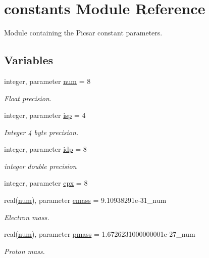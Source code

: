 \hypertarget{namespaceconstants}{}\section{constants Module Reference}
\label{namespaceconstants}


Module containing the Picsar constant parameters.  


\subsection*{Variables}
\begin{DoxyCompactItemize}
\item 
integer, parameter \hyperlink{namespaceconstants_afe19f7f8af171411c51fb763b36e3823}{num} = 8
\begin{DoxyCompactList}\small\item\em Float precision. \end{DoxyCompactList}\item 
integer, parameter \hyperlink{namespaceconstants_a5a2ae450a00d2a29f9b70dcb776f7a2f}{isp} = 4
\begin{DoxyCompactList}\small\item\em Integer 4 byte precision. \end{DoxyCompactList}\item 
integer, parameter \hyperlink{namespaceconstants_ae345db51770e3628e6aaf76e6a45e160}{idp} = 8
\begin{DoxyCompactList}\small\item\em integer double precision \end{DoxyCompactList}\item 
integer, parameter \hyperlink{namespaceconstants_a5709f0ae2ee52b1906446ad25ed0f587}{cpx} = 8
\item 
real(\hyperlink{namespaceconstants_afe19f7f8af171411c51fb763b36e3823}{num}), parameter \hyperlink{namespaceconstants_ad39536f583f0861abb2fb19a27c56fc8}{emass} = 9.\+10938291e-\/31\+\_\+num
\begin{DoxyCompactList}\small\item\em Electron mass. \end{DoxyCompactList}\item 
real(\hyperlink{namespaceconstants_afe19f7f8af171411c51fb763b36e3823}{num}), parameter \hyperlink{namespaceconstants_a44f3d8cbf9c39db63d7533d985cc51c3}{pmass} = 1.\+6726231000000001e-\/27\+\_\+num
\begin{DoxyCompactList}\small\item\em Proton mass. \end{DoxyCompactList}\item 

\end{DoxyCompactItemize}
